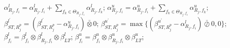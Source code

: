 \documentclass[preprint]{elsarticle}
\begin{document}
\begin{algorithm}[!ht]
\begin{algorithmic}[1]
                    \State $\alpha^l_{R_j,f_i}=\alpha^l_{R_j,f_i}+\sum_{f_k\in\Theta_{R_j,f_i}}\alpha^l_{R_j,f_k}$;
                    \State $\alpha^u_{R_j,f_i}=\alpha^u_{R_j,f_i}+\sum_{f_k\in\Theta_{R_j,f_i}}\alpha^u_{R_j,f_k}$;
                    \State $\beta^{l^\prime}_{ST,R_j^{p}}=(\beta^{l^\prime}_{ST,R_j^{p}}-\alpha^u_{R_j,f_i})\bar{\otimes}0$;
                    \State $\beta^{u^\prime}_{ST,R_j^{p}}=\max\{(\beta^{u^\prime}_{ST,R_j^{p}}-\alpha^l_{R_j,f_i})\bar{\oslash}0,0\}$;
                \EndIf
            \EndIf
            \State $\beta_{f_i}^l=\beta_{f_i}^l\otimes\beta^l_{R_j,f_i}\otimes\beta^l_{LT}$; $\beta_{f_i}^u=\beta_{f_i}^u\otimes\beta^u_{R_j,f_i}\otimes\beta^u_{LT}$;
        \EndFor
    \EndFor
\end{algorithmic}
\end{algorithm}
\end{document}
